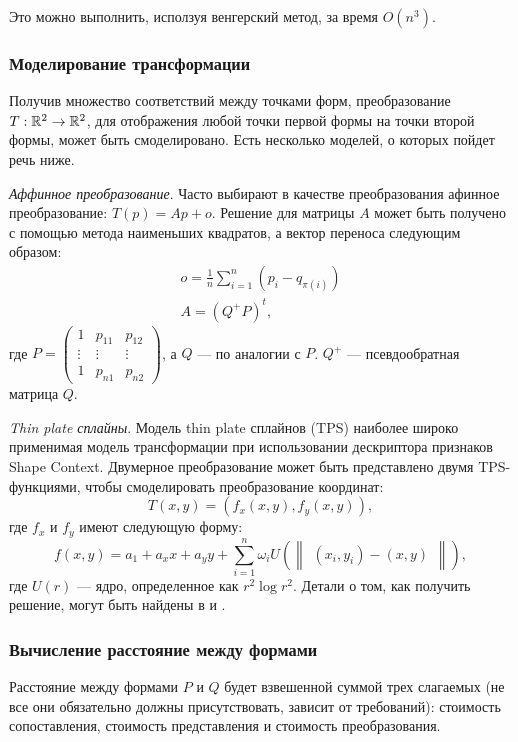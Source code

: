 Это можно выполнить, исползуя венгерский метод, за время $O(n^3)$.

\subsubsection{Моделирование трансформации}
Получив множество соответствий между точками форм, преобразование $T : \Bbb{R}^2 \to \Bbb{R}^2$, для отображения любой точки первой формы на точки второй формы, может быть смоделировано. Есть несколько моделей, о которых пойдет речь ниже.

\emph{Аффинное преобразование}. Часто выбирают в качестве преобразования афинное преобразование: $T(p) = Ap + o$. Решение для матрицы $A$ может быть получено с помощью метода наименьших квадратов, а вектор переноса следующим образом:
\begin{gather*}
  o = \frac{1}{n}\sum_{i=1}^n \left (p_i - q_{\pi(i)} \right )\\
  A = (Q^+ P)^t,
\end{gather*}
где $P = \begin{pmatrix}
  1 & p_{11} & p_{12} \\
  \vdots & \vdots & \vdots \\
  1 & p_{n1} & p_{n2}
  \end{pmatrix}$, а $Q$ --- по аналогии с $P$. $Q^+$ --- псевдообратная матрица $Q$.

\emph{Thin plate сплайны}. Модель thin plate сплайнов (TPS) наиболее широко применимая модель трансформации при использовании дескриптора признаков Shape Context. Двумерное преобразование может быть представлено двумя TPS-функциями, чтобы смоделировать преобразование координат:
\begin{displaymath}
  T(x,y) = \left (f_x(x,y),f_y(x,y)\right ),
\end{displaymath}
где $f_x$ и $f_y$ имеют следующую форму:
\begin{displaymath}
  f(x,y) = a_1 + a_xx + a_yy + \sum_{i=1}^n\omega_iU\left (\begin{Vmatrix}
    (x_i,y_i) - (x,y) \end{Vmatrix} \right ),
\end{displaymath}
где $U(r)$ --- ядро, определенное как $r^2\log r^2$. Детали о том, как получить решение, могут быть найдены в \cite{powell95} и \cite{duchon}.

\subsubsection{Вычисление расстояние между формами}
Расстояние между формами $P$ и $Q$ будет взвешенной суммой трех слагаемых (не все они обязательно должны присутствовать, зависит от требований): стоимость сопоставления, стоимость представления и стоимость преобразования.

